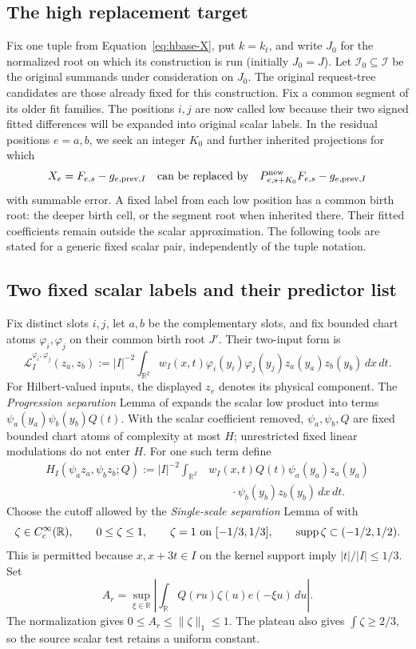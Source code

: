 \subsection{The high replacement target}

Fix one tuple from Equation~\eqref{eq:hbase-X}, put \(k=k_t\), and
write \(J_0\) for the normalized root on which its construction is
run (initially \(J_0=J\)).  Let \(\mathcal I_0\subseteq\mathcal I\)
be the original summands under consideration on \(J_0\).  The original
request-tree candidates are those already fixed for this construction.
Fix a common segment of its older fit families.  The positions \(i,j\) are now called low because their
two signed fitted differences will be expanded into original scalar
labels.  In the residual positions \(e=a,b\), we seek an integer
\(K_0\) and further inherited projections for which
\[
 X_e=F_{e,s}-g_{e,\mathrm{prev},I}
 \quad\hbox{can be replaced by}\quad
 P^{\rm new}_{e,s+K_0}F_{e,s}-g_{e,\mathrm{prev},I}
\]
with summable error.  A fixed label from each low position has a
common birth root: the deeper birth cell, or the segment root when
inherited there.  Their fitted coefficients remain outside the
scalar approximation.  The following tools are stated for a
generic fixed scalar pair, independently of the tuple notation.

\subsection{Two fixed scalar labels and their predictor list}

Fix distinct slots \(i,j\), let \(a,b\) be the complementary slots,
and fix bounded chart atoms \(\varphi_i,\varphi_j\) on their common
birth root \(J'\).  Their two-input form is
\[
 \mathcal L_I^{\varphi_i,\varphi_j}(z_a,z_b)
 :=|I|^{-2}\int_{\mathbb R^2}w_I(x,t)
       \varphi_i(y_i)\varphi_j(y_j)z_a(y_a)z_b(y_b)\,dx\,dt.
\]
For Hilbert-valued inputs, the displayed \(z_e\) denotes its physical
component.  The \emph{Progression separation} Lemma of
\cite[Section~4]{H} expands the scalar low product into terms
\(\psi_a(y_a)\psi_b(y_b)Q(t)\).  With the scalar coefficient removed,
\(\psi_a,\psi_b,Q\) are fixed bounded chart atoms of complexity at
most \(H\); unrestricted fixed linear modulations do not enter \(H\).
For one such term define
\[
 \begin{split}
 H_I(\psi_a z_a,\psi_b z_b;Q)
 :=|I|^{-2}\int_{\mathbb R^2}&w_I(x,t)Q(t)
       \psi_a(y_a)z_a(y_a)\\
       &\qquad\cdot\psi_b(y_b)z_b(y_b)\,dx\,dt .
 \end{split}
\]
Choose the cutoff allowed by the \emph{Single-scale separation} Lemma
of \cite[Section~4]{H} with
\[
 \zeta\in C_c^\infty(\mathbb R),\qquad
 0\le\zeta\le1,\qquad \zeta=1\ \hbox{on }[-1/3,1/3],
 \qquad \operatorname{supp}\zeta\subset(-1/2,1/2).
\]
This is permitted because \(x,x+3t\in I\) on the kernel support
imply \(|t|/|I|\le1/3\).  Set
\[
 A_r=\sup_{\xi\in\mathbb R}
       \left|\int_{\mathbb R}Q(ru)\zeta(u)e(-\xi u)\,du\right|.
\]
The normalization gives \(0\le A_r\le\|\zeta\|_1\le1\).
The plateau also gives \(\int\zeta\ge2/3\), so the source scalar
test retains a uniform constant.

